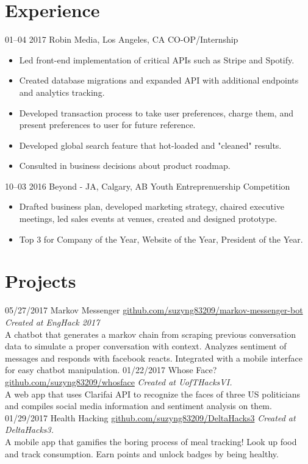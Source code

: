 \documentclass[]{friggeri-cv}
\begin{document}
\section{Experience}

\begin{entrylist}
	\entry
	{01–04 2017}
	{Robin Media, Los Angeles, CA}
	{CO-OP/Internship}
	{
		\begin{itemize}[leftmargin=*]
			\item Led front-end implementation of critical APIs such as Stripe and Spotify.
			\item Created database migrations and expanded API with additional endpoints and analytics tracking.
			\item Developed transaction process to take user preferences, charge them, and present preferences to user for future reference.
			\item Developed global search feature that hot-loaded and "cleaned" results.
			\item Consulted in business decisions about product roadmap.
		\end{itemize}
	}
	\entry
	{10–03 2016}
	{Beyond - JA, Calgary, AB}
	{Youth Entreprenuership Competition}
	{
		\begin{itemize}[leftmargin=*]
			\item Drafted business plan, developed marketing strategy, chaired executive meetings, led sales events at venues, created and designed  prototype.
			\item Top 3 for Company of the Year, Website of the Year, President of the Year.
	\end{itemize}}
\end{entrylist}

\section{Projects}

\begin{entrylist}
	\entry
	{05/27/2017}
	{Markov Messenger}
	{\href{https://github.com/suzyng83209/markov-messenger-bot}{github.com/suzyng83209/markov-messenger-bot}}
	{\emph{Created at EngHack 2017} \\
		A chatbot that generates a markov chain from scraping previous conversation data to simulate a proper conversation with context. Analyzes sentiment of messages and responds with facebook reacts. Integrated with a mobile interface for easy chatbot manipulation.}
	\entry
	{01/22/2017}
	{Whose Face?}
	{\href{https://github.com/suzyng83209/whosface}{github.com/suzyng83209/whosface}}
	{\emph{Created at UofTHacksVI.} \\
		A web app that uses Clarifai API to recognize the faces of three US politicians and compiles social media information and sentiment analysis on them.}
	\entry
	{01/29/2017}
	{Health Hacking}
	{\href{https://github.com/suzyng83209/DeltaHacks3}{github.com/suzyng83209/DeltaHacks3}}
	{\emph{Created at DeltaHacks3.} \\
		A mobile app that gamifies the boring process of meal tracking! Look up food and track consumption. Earn points and unlock badges by being healthy.}
\end{entrylist}
\end{document}

